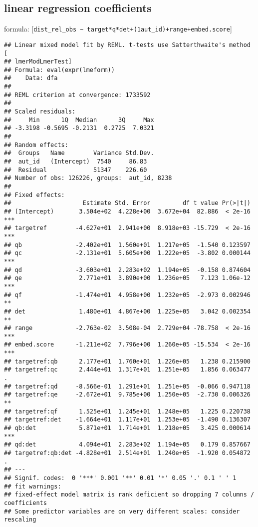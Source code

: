 \documentclass[
  12pt,
  oneside]{book}
\begin{document}
\subsection{linear regression coefficients}\label{linear-regression-coefficients}

formula: {[}\texttt{dist\_rel\_obs\ \textasciitilde{}\ target*q*det+(1\textbar{}aut\_id)+range+embed.score}{]}

\begin{verbatim}
## Linear mixed model fit by REML. t-tests use Satterthwaite's method [
## lmerModLmerTest]
## Formula: eval(expr(lmeform))
##    Data: dfa
## 
## REML criterion at convergence: 1733592
## 
## Scaled residuals: 
##     Min      1Q  Median      3Q     Max 
## -3.3198 -0.5695 -0.2131  0.2725  7.0321 
## 
## Random effects:
##  Groups   Name        Variance Std.Dev.
##  aut_id   (Intercept)  7540     86.83  
##  Residual             51347    226.60  
## Number of obs: 126226, groups:  aut_id, 8238
## 
## Fixed effects:
##                    Estimate Std. Error         df t value Pr(>|t|)    
## (Intercept)       3.504e+02  4.228e+00  3.672e+04  82.886  < 2e-16 ***
## targetref        -4.627e+01  2.941e+00  8.918e+03 -15.729  < 2e-16 ***
## qb               -2.402e+01  1.560e+01  1.217e+05  -1.540 0.123597    
## qc               -2.131e+01  5.605e+00  1.222e+05  -3.802 0.000144 ***
## qd               -3.603e+01  2.283e+02  1.194e+05  -0.158 0.874604    
## qe                2.771e+01  3.890e+00  1.236e+05   7.123 1.06e-12 ***
## qf               -1.474e+01  4.958e+00  1.232e+05  -2.973 0.002946 ** 
## det               1.480e+01  4.867e+00  1.225e+05   3.042 0.002354 ** 
## range            -2.763e-02  3.508e-04  2.729e+04 -78.758  < 2e-16 ***
## embed.score      -1.211e+02  7.796e+00  1.260e+05 -15.534  < 2e-16 ***
## targetref:qb      2.177e+01  1.760e+01  1.226e+05   1.238 0.215900    
## targetref:qc      2.444e+01  1.317e+01  1.251e+05   1.856 0.063477 .  
## targetref:qd     -8.566e-01  1.291e+01  1.251e+05  -0.066 0.947118    
## targetref:qe     -2.672e+01  9.785e+00  1.250e+05  -2.730 0.006326 ** 
## targetref:qf      1.525e+01  1.245e+01  1.248e+05   1.225 0.220738    
## targetref:det    -1.664e+01  1.117e+01  1.253e+05  -1.490 0.136307    
## qb:det            5.871e+01  1.714e+01  1.218e+05   3.425 0.000614 ***
## qd:det            4.094e+01  2.283e+02  1.194e+05   0.179 0.857667    
## targetref:qb:det -4.828e+01  2.514e+01  1.240e+05  -1.920 0.054872 .  
## ---
## Signif. codes:  0 '***' 0.001 '**' 0.01 '*' 0.05 '.' 0.1 ' ' 1
## fit warnings:
## fixed-effect model matrix is rank deficient so dropping 7 columns / coefficients
## Some predictor variables are on very different scales: consider rescaling
\end{verbatim}
\end{document}
